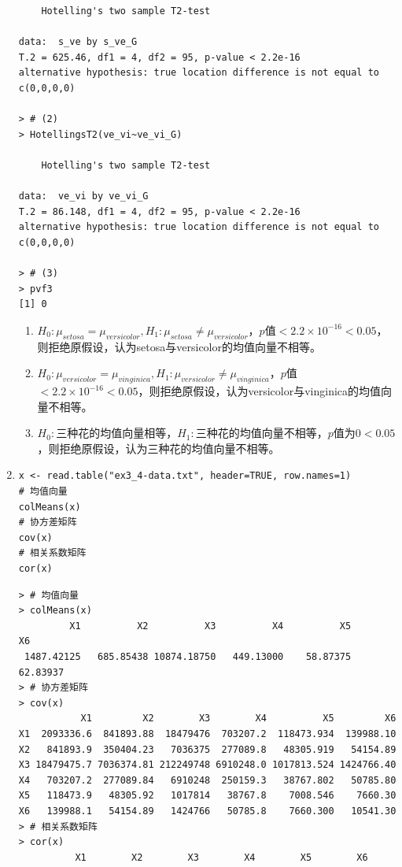 \begin{enumerate}
\begin{lstlisting}
	Hotelling's two sample T2-test

data:  s_ve by s_ve_G
T.2 = 625.46, df1 = 4, df2 = 95, p-value < 2.2e-16
alternative hypothesis: true location difference is not equal to c(0,0,0,0)

> # (2)
> HotellingsT2(ve_vi~ve_vi_G)

	Hotelling's two sample T2-test

data:  ve_vi by ve_vi_G
T.2 = 86.148, df1 = 4, df2 = 95, p-value < 2.2e-16
alternative hypothesis: true location difference is not equal to c(0,0,0,0)

> # (3)
> pvf3
[1] 0
\end{lstlisting}
        \summary
        \begin{enumerate}[label=(\arabic*)]
            \item $H_0:\mu_{setosa}=\mu_{versicolor},H_1:\mu_{setosa} \neq \mu_{versicolor}$，$p$值$< 2.2\times 10^{-16}<0.05$，则拒绝原假设，认为setosa与versicolor的均值向量不相等。
            \item $H_0:\mu_{versicolor}=\mu_{vinginica},H_1:\mu_{versicolor} \neq \mu_{vinginica}$，$p$值$< 2.2\times 10^{-16}<0.05$，则拒绝原假设，认为versicolor与vinginica的均值向量不相等。
            \item $H_0:$三种花的均值向量相等，$H_1:$三种花的均值向量不相等，$p$值为$0<0.05$，则拒绝原假设，认为三种花的均值向量不相等。
        \end{enumerate}
        \item
        \code
\begin{lstlisting}
x <- read.table("ex3_4-data.txt", header=TRUE, row.names=1)
# 均值向量
colMeans(x)
# 协方差矩阵
cov(x)
# 相关系数矩阵
cor(x)
\end{lstlisting}
        \out
\begin{lstlisting}
> # 均值向量
> colMeans(x)
         X1          X2          X3          X4          X5          X6 
 1487.42125   685.85438 10874.18750   449.13000    58.87375    62.83937 
> # 协方差矩阵
> cov(x)
           X1         X2        X3        X4          X5         X6
X1  2093336.6  841893.88  18479476  703207.2  118473.934  139988.10
X2   841893.9  350404.23   7036375  277089.8   48305.919   54154.89
X3 18479475.7 7036374.81 212249748 6910248.0 1017813.524 1424766.40
X4   703207.2  277089.84   6910248  250159.3   38767.802   50785.80
X5   118473.9   48305.92   1017814   38767.8    7008.546    7660.30
X6   139988.1   54154.89   1424766   50785.8    7660.300   10541.30
> # 相关系数矩阵
> cor(x)
          X1        X2        X3        X4        X5        X6

\end{lstlisting}
\end{enumerate}

